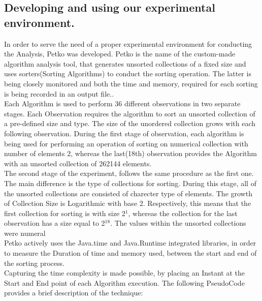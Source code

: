 \documentclass[]{report}
\begin{document}
	\subsection{Developing and using our experimental environment.}
	In order to serve the need of a proper experimental environment  for conducting the Analysis, Petko was developed. Petko is the name of the custom-made  algorithm analysis tool, that generates unsorted collections of a fixed size and uses sorters(Sorting Algorithms) to conduct the sorting operation. The latter is being closely monitored and both the time and memory, required for each sorting is being recorded in an output file.. \\
	Each Algorithm is used to perform 36 different observations in two separate stages. Each Observation requires the algorithm to sort an unsorted collection of a pre-defined size and type. The size of the unordered collection grows with each following observation. During the first stage of observation, each algorithm is being used for performing an operation of sorting on numerical collection with number of elements 2, whereas the last(18th) observation provides the Algorithm with an unsorted collection of 262144 elements. \\
	The second stage of the experiment, follows the same procedure as the first one. The main difference is the type of collections for sorting. During this stage, all of the unsorted collections are consisted of charecter type of elements.
	 The growth of Collection Size is Logarithmic with base 2. Respectively, this means that the first collection for sorting is with size 2$^{1}$, whereas the collection for the last observation has a size equal to 2$^{18}$. The values within the unsorted collections were numeral\\
	Petko actively uses the Java.time and Java.Runtime integrated libraries, in order to measure the Duration of time and memory used, between the start and end of the sorting process. \\
	Capturing the time complexity is made possible, by placing an Instant at the Start and End point of each Algorithm execution. The following PseudoCode provides a brief description of the technique:
\end{document}
